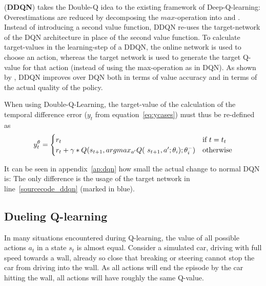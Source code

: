 \noindent {} (\textbf{DDQN}) takes the Double-Q idea to the existing framework of Deep-Q-learning: Overestimations are reduced by decomposing the $max$-operation into  and . Instead of introducing a second value function, DDQN re-uses the target-network of the DQN architecture in place of the second value function. To calculate target-values in the learning-step of a DDQN, the online network is used to choose an action, whereas the target network is used to generate the target Q-value for that action (instead of using the max-operation as in DQN). As shown by \cite{van_hasselt_deep_2015}, DDQN improves over DQN both in terms of value accuracy and in terms of the actual quality of the policy. 

When using Double-Q-Learning, the target-value of the calculation of the temporal difference error ($y_t$ from equation~\ref{eq:ycases}) must thus be re-defined as 
\begin{equation}
		y_t^\theta = \begin{cases} 
	r_t & \text{if } t = t_t\\
	r_t + \gamma * Q(s_{t+1}, argmax_{a'} Q($  $s_{t+1}, a'; \theta_i); \theta_i^-) & \text{otherwise} 
	\end{cases} %
\end{equation}

It can be seen in appendix~\ref{ap:dqn} how small the actual change to normal DQN is: The only difference is the usage of the target network in line~\ref{sourcecode_ddqn} (marked in blue).

\subsection{Dueling Q-learning}

\label{sec:dueling}

In many situations encountered during Q-learning, the value of all possible actions $a_t$ in a state $s_t$ is almost equal. Consider a simulated car, driving with full speed towards a wall, already so close that breaking or steering cannot stop the car from driving into the wall. As all actions will end the episode by the car hitting the wall, all actions will have roughly the same Q-value. 

